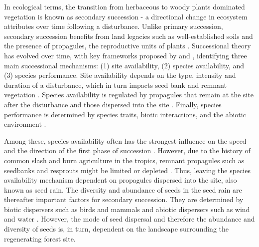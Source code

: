 In ecological terms, the transition from herbaceous to woody plants dominated vegetation is known as secondary succession - a directional change in ecosystem attributes over time following a disturbance. Unlike primary succession, secondary succession benefits from land legacies such as well-established soils and the presence of propagules, the reproductive units of plants \citep{poorterSuccessionalTheories2023}. %
Successional theory has evolved over time, with 
key frameworks proposed by \citet{pickettHierarchicalConsiderationCauses1987} and \citet{poorterComprehensiveFrameworkVegetation2024}, identifying three main successional mechanisms: (1) site availability, (2) species availability, and (3) species performance. Site availability depends on the type, intensity and duration of a disturbance, which in turn impacts seed bank and remnant vegetation \citep{poorterComprehensiveFrameworkVegetation2024}. Species availability is regulated by propagules that remain at the site after the disturbance and those dispersed into the site \citep{gleasonIndividualisticConceptPlant1926, dentUnitingNicheDifferentiation2021}. Finally, species performance is determined by species traits, biotic interactions, and the abiotic environment \citep{poorterComprehensiveFrameworkVegetation2024}. 

Among these, species availability often has the strongest influence on the speed and the direction of the first phase of succession \citep{poorterSuccessionalTheories2023, dentUnitingNicheDifferentiation2021}. However, due to the history of common slash and burn agriculture in the tropics, remnant propagules such as seedbanks and resprouts might be limited or depleted \citep{jack}. Thus, leaving the species availability mechanism dependent on propagules dispersed into the site, also known as seed rain. The diversity and abundance of seeds in the seed rain are thereafter important factors for secondary succession. They are determined by biotic dispersers such as birds and mammals and abiotic dispersers such as wind and water \citep{poorterComprehensiveFrameworkVegetation2024}. However, the mode of seed dispersal and therefore the abundance and diversity of seeds is, in turn, dependent on the landscape surrounding the regenerating forest site. 


